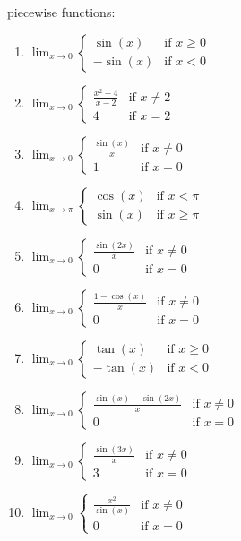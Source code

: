 \documentclass{article}
\begin{document}
piecewise functions:
\begin{enumerate}
        \item $\lim_{x \to 0} \left\{ \begin{array}{ll} 
        \sin(x) & \text{if } x \geq 0 \\
        -\sin(x) & \text{if } x < 0 \end{array} \right.$
        \item $\lim_{x \to 0} \left\{ \begin{array}{ll} 
        \frac{x^2 - 4}{x - 2} & \text{if } x \neq 2 \\
        4 & \text{if } x = 2 \end{array} \right.$
        \item $\lim_{x \to 0} \left\{ \begin{array}{ll} 
        \frac{\sin(x)}{x} & \text{if } x \neq 0 \\
        1 & \text{if } x = 0 \end{array} \right.$
        \item $\lim_{x \to \pi} \left\{ \begin{array}{ll} 
        \cos(x) & \text{if } x < \pi \\
        \sin(x) & \text{if } x \geq \pi \end{array} \right.$
        \item $\lim_{x \to 0} \left\{ \begin{array}{ll} 
        \frac{\sin(2x)}{x} & \text{if } x \neq 0 \\
        0 & \text{if } x = 0 \end{array} \right.$
        \item $\lim_{x \to 0} \left\{ \begin{array}{ll} 
        \frac{1 - \cos(x)}{x} & \text{if } x \neq 0 \\
        0 & \text{if } x = 0 \end{array} \right.$
        \item $\lim_{x \to 0} \left\{ \begin{array}{ll} 
        \tan(x) & \text{if } x \geq 0 \\
        -\tan(x) & \text{if } x < 0 \end{array} \right.$
        \item $\lim_{x \to 0} \left\{ \begin{array}{ll} 
        \frac{\sin(x) - \sin(2x)}{x} & \text{if } x \neq 0 \\
        0 & \text{if } x = 0 \end{array} \right.$
        \item $\lim_{x \to 0} \left\{ \begin{array}{ll} 
        \frac{\sin(3x)}{x} & \text{if } x \neq 0 \\
        3 & \text{if } x = 0 \end{array} \right.$
        \item $\lim_{x \to 0} \left\{ \begin{array}{ll} 
        \frac{x^2}{\sin(x)} & \text{if } x \neq 0 \\
        0 & \text{if } x = 0 \end{array} \right.$
\end{enumerate}
\end{document}

